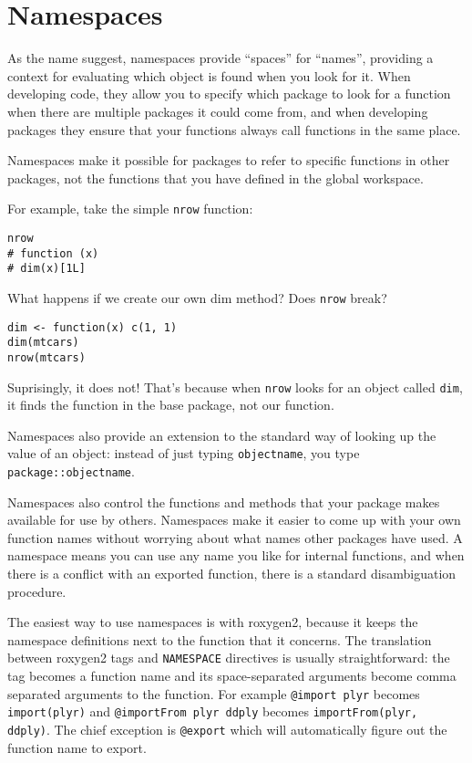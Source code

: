 \chapter{Namespaces}

As the name suggest, namespaces provide ``spaces'' for ``names'',
providing a context for evaluating which object is found when you look
for it. When developing code, they allow you to specify which package to
look for a function when there are multiple packages it could come from,
and when developing packages they ensure that your functions always call
functions in the same place.

Namespaces make it possible for packages to refer to specific functions
in other packages, not the functions that you have defined in the global
workspace.

For example, take the simple \texttt{nrow} function:

\begin{verbatim}
nrow
# function (x) 
# dim(x)[1L]
\end{verbatim}

What happens if we create our own dim method? Does \texttt{nrow} break?

\begin{verbatim}
dim <- function(x) c(1, 1)
dim(mtcars)
nrow(mtcars)
\end{verbatim}

Suprisingly, it does not! That's because when \texttt{nrow} looks for an
object called \texttt{dim}, it finds the function in the base package,
not our function.

Namespaces also provide an extension to the standard way of looking up
the value of an object: instead of just typing \texttt{objectname}, you
type \texttt{package::objectname}.

Namespaces also control the functions and methods that your package
makes available for use by others. Namespaces make it easier to come up
with your own function names without worrying about what names other
packages have used. A namespace means you can use any name you like for
internal functions, and when there is a conflict with an exported
function, there is a standard disambiguation procedure.

The easiest way to use namespaces is with roxygen2, because it keeps the
namespace definitions next to the function that it concerns. The
translation between roxygen2 tags and \texttt{NAMESPACE} directives is
usually straightforward: the tag becomes a function name and its
space-separated arguments become comma separated arguments to the
function. For example \texttt{@import plyr} becomes
\texttt{import(plyr)} and \texttt{@importFrom plyr ddply} becomes
\texttt{importFrom(plyr, ddply)}. The chief exception is
\texttt{@export} which will automatically figure out the function name
to export.

